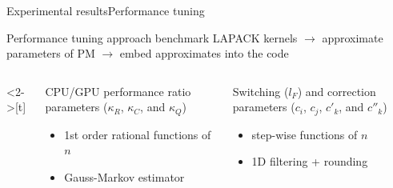 \documentclass[xcolor=table,final]{beamer} %
\begin{document}
\begin{frame}{Experimental results}{Performance tuning}

  \begin{block}{Performance tuning approach}
    benchmark LAPACK kernels 
    $\to$
    approximate parameters of PM %
    $\to$
    embed approximates into the code
  \end{block}

  \begin{columns}<2->[t]%
    \begin{column}[t]{0.5\textwidth}
      \centering
      CPU/GPU performance ratio parameters 
      ($\kappa_R$, $\kappa_C$, and $\kappa_Q$)

      
      \begin{itemize}
        \small
      \item 1st order rational functions of $n$
      \item Gauss-Markov estimator
      \end{itemize}
    \end{column}

    \begin{column}[t]{0.5\textwidth}
      \centering
      Switching ($l_F$) and  correction parameters 
      ($c_i$, $c_j$, $c'_k$, and $c''_k$)

      \begin{itemize}
        \small
      \item %
        step-wise functions of $n$
      \item 1D filtering + rounding
      \end{itemize}
    \end{column}

  \end{columns}
\end{frame}

\end{document}
